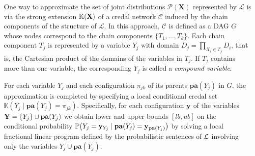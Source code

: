 \documentclass{article}
\newcommand{\pr}[1]{\mathbb{P}\!\left( #1 \right)}
\begin{document}
One way to approximate the set of joint distributions $\mathcal{P}(\mathbf{X})$ represented by $\mathcal{L}$ is via the strong extension $\mathbb{K}(\mathbf{X})$ of a credal network $\mathcal{C}$ induced by the chain components of the structure of $\mathcal{L}$. 
In this approach, $\mathcal{C}$ is defined as a DAG $G$ whose nodes correspond to the chain components $\{T_1,\ldots,T_k\}$. 
Each chain component $T_j$ is represented by a variable $Y_j$ with domain $D_j = \prod_{X_i \in T_j} D_i$,
that is, the Cartesian product of the domains of the variables in $T_j$. If $T_j$ contains more than one variable, the corresponding $Y_j$ is called a \emph{compound variable}. 

For each variable $Y_j$ and each configuration $\pi_{jk}$ of its parents $\mathbf{pa}(Y_j)$ in $G$, the approximation is completed by specifying a local conditional credal set $\mathbb{K} (Y_j \mid \mathbf{pa}(Y_j) = \pi_{jk})$. Specifically, for each configuration $\mathbf{y}$ of the variables $\mathbf{Y} = \{Y_j\} \cup \mathbf{pa}(Y_j)$ we obtain lower and upper bounds $[lb, ub]$ on the conditional probability $\pr{Y_j = \by_{Y_j} \mid \mathbf{pa}(Y_j) = \by_{\mathbf{pa}(Y_j)}}$ by solving a local fractional linear program defined by the probabilistic sentences of $\mathcal{L}$ involving only the variables $Y_j \cup \mathbf{pa}(Y_j)$.
\end{document}
